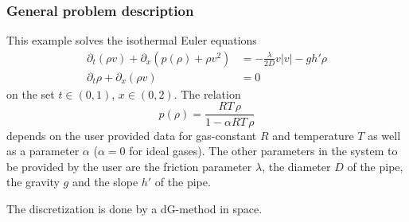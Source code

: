 \subsubsection{General problem description}
This example solves the isothermal Euler equations
\begin{align*}
 \partial_t(\rho v) + \partial_x (p(\rho)+ \rho v^2) &= - \frac{\lambda}{2D} v|v| - gh' \rho\\
 \partial_t \rho + \partial_x (\rho v) &=0
\end{align*}
on the set $t \in (0,1)$, $x \in (0,2)$.
The relation 
\[
p(\rho) = \frac{RT\, \rho}{1-\alpha RT\,\rho}
\]
depends on the user provided data for gas-constant $R$ and temperature $T$ as well as a parameter 
$\alpha$ ($\alpha = 0$ for ideal gases).
The other parameters in the system to be provided by the user are 
the friction parameter $\lambda$, the diameter $D$ of the pipe, the gravity $g$ and the slope $h'$ of the 
pipe. 

The discretization is done by a dG-method in space.
